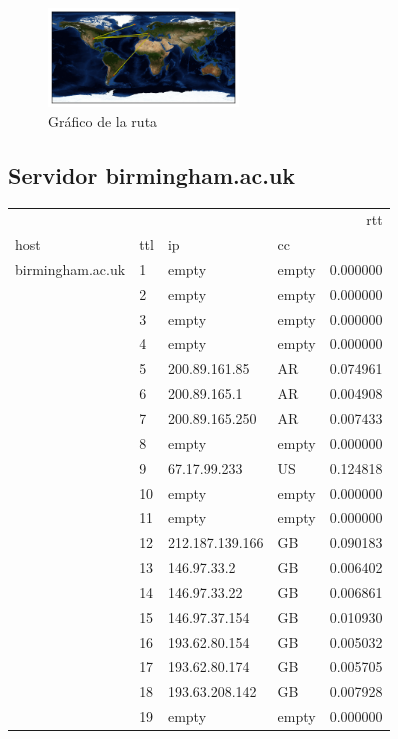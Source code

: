 \begin{figure}[H]
  \centering
    \includegraphics[width=0.45\textwidth]{grafico-rutas/bifrost-is.png}
  \caption{Gráfico de la ruta}
  \label{entropia-s}
\end{figure}




\subsection{Servidor birmingham.ac.uk}

\begin{center}
\begin{tabular}{llllr}
\toprule
                 &    &             &    &       rtt \\
host & ttl & ip & cc &           \\
\midrule
birmingham.ac.uk & 1  & empty & empty &  0.000000 \\
                 & 2  & empty & empty &  0.000000 \\
                 & 3  & empty & empty &  0.000000 \\
                 & 4  & empty & empty &  0.000000 \\
                 & 5  & 200.89.161.85 & AR &  0.074961 \\
                 & 6  & 200.89.165.1 & AR &  0.004908 \\
                 & 7  & 200.89.165.250 & AR &  0.007433 \\
                 & 8  & empty & empty &  0.000000 \\
                 & 9  & 67.17.99.233 & US &  0.124818 \\
                 & 10 & empty & empty &  0.000000 \\
                 & 11 & empty & empty &  0.000000 \\
                 & 12 & 212.187.139.166 & GB &  0.090183 \\
                 & 13 & 146.97.33.2 & GB &  0.006402 \\
                 & 14 & 146.97.33.22 & GB &  0.006861 \\
                 & 15 & 146.97.37.154 & GB &  0.010930 \\
                 & 16 & 193.62.80.154 & GB &  0.005032 \\
                 & 17 & 193.62.80.174 & GB &  0.005705 \\
                 & 18 & 193.63.208.142 & GB &  0.007928 \\
                 & 19 & empty & empty &  0.000000 \\
\bottomrule
\end{tabular}

\end{center}

